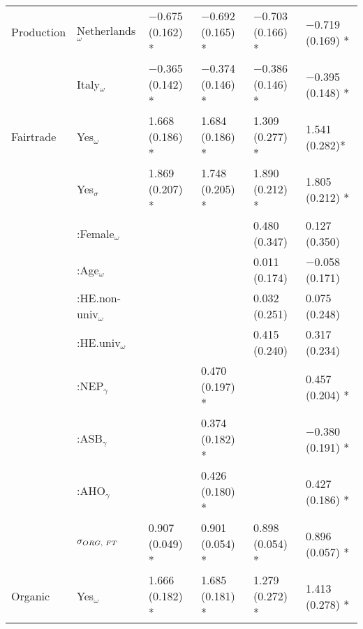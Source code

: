 \documentclass[sustainability,article,accept,moreauthors,pdftex,10pt,a4paper]{Definitions/mdpi}
\theoremstyle{mdpi}
\theoremstyle{mdpidefinition}
\begin{document}
{{\begin{table}[H]
{\begin{tabular}{p{2cm}p{2.5cm}p{2.5cm}p{2.5cm}p{2.5cm} p{2.5cm}}
\midrule
Production&Netherlands$_\omega$&                 $-$0.675 (0.162) *              & $-$0.692 (0.165) *                   & $-$0.703 (0.166) *                       &  $-$0.719 (0.169) *  \\
& Italy$_\omega$ &                        $-$0.365 (0.142) *              & $-$0.374 (0.146) *                   & $-$0.386 (0.146) *                       & $-$0.395 (0.148) * \\
\midrule
Fairtrade & Yes$_\omega$ &                1.668 (0.186) *              & 1.684 (0.186) *                   & 1.309 (0.277) *                        & 1.541 (0.282)*  \\
& Yes$_\sigma$  &                 1.869 (0.207) *              & 1.748 (0.205) *                   & 1.890 (0.212) *                        &   1.805 (0.212) *\\
& :Female$_\omega$ &                                          &                                  & 0.480 (0.347)                         &  0.127 (0.350) \\
& :Age$_\omega$  &                                            &                                  & 0.011 (0.174)                         &  $-$0.058 (0.171) \\
& :HE.non-univ$_\omega$ &                                     &                                   & 0.032 (0.251)                         & 0.075 (0.248) \\
&:HE.univ$_\omega$ &                                          &                                    & 0.415 (0.240)                         & 0.317 (0.234)  \\
& :NEP$_\gamma$ &                                             & 0.470 (0.197) *                      &                                      &  0.457 (0.204) * \\
& :ASB$_\gamma$ &                                             & 0.374 (0.182) *                   &                                      &  $-$0.380 (0.191) * \\
& :AHO$_\gamma$ &                                             &  0.426 (0.180) *                    &                                      & 0.427 (0.186) * \\
& $\sigma_{ORG,\hspace{1mm} FT}$ & 0.907 (0.049) *   & 0.901 (0.054) *               & 0.898 (0.054) *                        & 0.896 (0.057) * \\
\midrule
Organic& Yes$_\omega$ &                  1.666 (0.182) *               & 1.685 (0.181) *                    & 1.279 (0.272) *                        &  1.413 (0.278) * \\

\end{tabular}}
\end{table}}}
\end{document}
